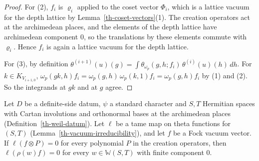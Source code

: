 \begin{proof}
For (2), $f_i$ is $\varrho_i$ applied to the coset vector $\Phi_i$, which is a
lattice vacuum for the depth lattice by Lemma~\ref{th-coset-vectors}(1). The
creation operators act at the archimedean places, and the elements of the
depth lattice have archimedean component $0$, so the translations by these
elements commute with $\varrho_i$. Hence $f_i$ is again a lattice vacuum for
the depth lattice.

For (3), by definition
$\theta^{(i+1)}(u)(g)=\int\theta_{\omega_p}(g,h;f_i)\,\theta^{(i)}(u)(h)\,dh$.
For $k\in K_{V_{i+1,0}}$,
$\omega_p(gk,h)f_i=\omega_p(g,h)\,\omega_p(k,1)f_i=\omega_p(g,h)f_i$ by (1)
and (2). So the integrands at $gk$ and at $g$ agree.
\end{proof}

\begin{lemma}\label{th-fock-translates}
Let $D$ be a definite-side datum, $\psi$ a standard character and $S,T$
Hermitian spaces with Cartan involutions and orthonormal bases at the
archimedean places (Definition~\ref{th-weil-datum}). Let $\ell$ be a tame map on
theta functions for $(S,T)$ (Lemma~\ref{th-vacuum-irreducibility}), and let $f$
be a Fock vacuum vector. If $\ell(f\otimes P)=0$ for every polynomial $P$ in the
creation operators, then $\ell(\rho(w)f)=0$ for every $w\in\mathbb W(S,T)$ with
finite component $0$.
\end{lemma}
